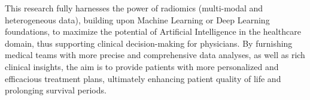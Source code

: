 \begin{englishabstract}
This research fully harnesses the power of radiomics (multi-modal and heterogeneous data), building upon Machine Learning or Deep Learning foundations, to maximize the potential of Artificial Intelligence in the healthcare domain, thus supporting clinical decision-making for physicians. By furnishing medical teams with more precise and comprehensive data analyses, as well as rich clinical insights, the aim is to provide patients with more personalized and efficacious treatment plans, ultimately enhancing patient quality of life and prolonging survival periods.

\end{englishabstract}

